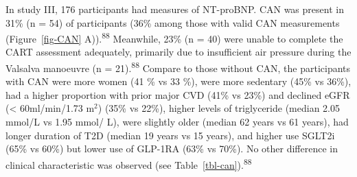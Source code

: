 \documentclass[
  a4paper,
  headsepline=true,
  open=any]{scrbook}
\begin{document}
In study III, 176 participants had measures of NT-proBNP. CAN was
present in 31\% (n = 54) of participants (36\% among those with valid
CAN measurements (Figure~\ref{fig-CAN} A)).\textsuperscript{88}
Meanwhile, 23\% (n = 40) were unable to complete the CART assessment
adequately, primarily due to insufficient air pressure during the
Valsalva manoeuvre (n = 21).\textsuperscript{88} Compare to those
without CAN, the participants with CAN were more women (41 \% vs 33 \%),
were more sedentary (45\% vs 36\%), had a higher proportion with prior
major CVD (41\% vs 23\%) and declined eGFR (\textless{} 60ml/min/1.73
m\(^2\)) (35\% vs 22\%), higher levels of triglyceride (median 2.05
mmol/L vs 1.95 mmol/ L), were slightly older (median 62 years vs 61
years), had longer duration of T2D (median 19 years vs 15 years), and
higher use SGLT2i (65\% vs 60\%) but lower use of GLP-1RA (63\% vs
70\%). No other difference in clinical characteristic was observed (see
Table~\ref{tbl-can}).\textsuperscript{88}

\end{document}
